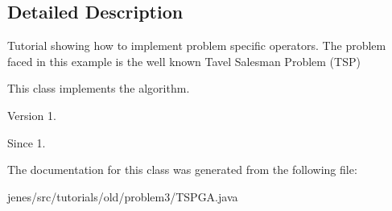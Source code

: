 \subsection{Detailed Description}
Tutorial showing how to implement problem specific operators. The problem faced in this example is the well known Tavel Salesman Problem (T\-S\-P)

This class implements the algorithm.

\begin{DoxyVersion}{Version}
1. 
\end{DoxyVersion}
\begin{DoxySince}{Since}
1. 
\end{DoxySince}


The documentation for this class was generated from the following file\-:\begin{DoxyCompactItemize}
\item 
jenes/src/tutorials/old/problem3/T\-S\-P\-G\-A.\-java\end{DoxyCompactItemize}
